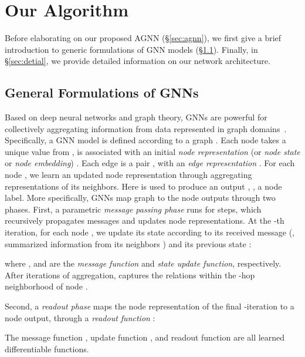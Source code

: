 \documentclass[10pt,twocolumn,letterpaper]{article}
\begin{document}
\vspace*{-4pt}
\section{Our Algorithm}
\vspace*{-4pt}	
Before elaborating on our proposed AGNN (\S\ref{sec:agnn}), we first give a brief introduction to generic formulations of GNN models (\S\ref{sec:forgnn}). Finally, in \S\ref{sec:detial}, we provide detailed information on our network architecture.
	\vspace*{-3pt}
\subsection{General Formulations of GNNs}\label{sec:forgnn}
	\vspace*{-3pt}	
Based on deep neural networks and graph theory,  GNNs are powerful for collectively aggregating information from data represented in graph domains~\cite{scarselli2009graph,gilmer2017neural}. Specifically, a GNN model is defined according to a graph . Each node  takes a unique value from , is associated with an initial \textit{node representation}
(or \textit{node state} or \textit{node embedding}) . Each edge  is a pair , with an \textit{edge representation} . For each node , we learn an updated node representation  through aggregating representations
of its neighbors. Here  is used to produce an output , \ie, a node label.
More specifically, GNNs map graph  to the node outputs  through two phases. First, a parametric \textit{message passing phase} runs for  steps, which recursively propagates messages and updates node representations. At the -th iteration, for each node , we update its state according to its received message  (\ie, summarized information from its neighbors ) and its previous state :
	\vspace*{-4pt}	

where ,  and  are the \textit{message function} and \textit{state update function}, respectively.
After  iterations of aggregation,  captures the relations within the -hop neighborhood of node .

Second, a \textit{readout phase} maps the node representation  of the final -iteration to a node output, through a \textit{readout function} :
	\vspace*{-4pt}	

The message function , update function , and readout function  are all learned differentiable functions.
\end{document}
